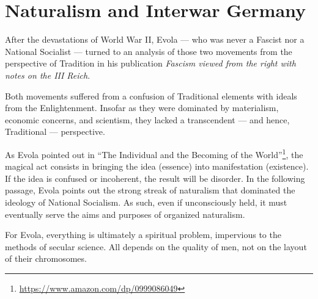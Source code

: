 \section{Naturalism and Interwar Germany}

After the devastations of World War II, Evola --- who was never a Fascist nor a National Socialist --- turned to an analysis of those two movements from the perspective of Tradition in his publication
\emph{Fascism viewed from the right with notes on the III Reich}.


Both movements suffered from a confusion of Traditional elements with ideals from the Enlightenment. Insofar as they were dominated by materialism, economic concerns, and scientism, they lacked a transcendent --- and hence, Traditional --- perspective.

As Evola pointed out in ``The Individual and the Becoming of the World''\footnote{\url{https://www.amazon.com/dp/0999086049}}, the magical act consists in bringing the idea (essence) into manifestation (existence). If the idea is confused or incoherent, the result will be disorder. In the following passage, Evola points out the strong streak of naturalism that dominated the ideology of National Socialism. As such, even if unconsciously held, it must eventually serve the aims and purposes of organized naturalism.

For Evola, everything is ultimately a spiritual problem, impervious to the methods of secular science. All depends on the quality of men, not on the layout of their chromosomes.

